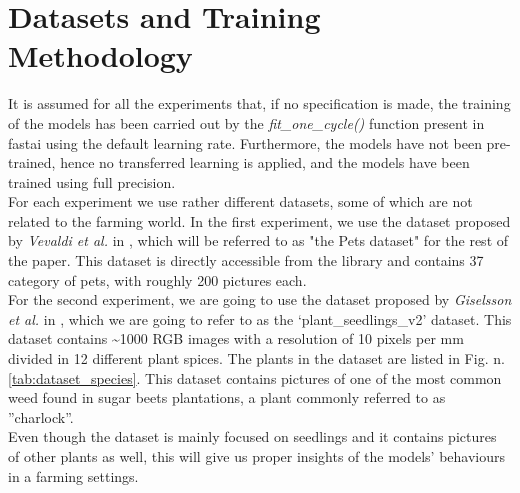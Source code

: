 \section{Datasets and Training Methodology}\label{sec:data_models}
It is assumed for all the experiments that, if no specification is made, the training of the models has been carried out by the \textit{fit\_one\_cycle()} function present in fastai using the default learning rate. Furthermore, the models have not been pre-trained, hence no transferred learning is applied, and the models have been trained using full precision. \\
For each experiment we use rather different datasets, some of which are not related to the farming world. In the first experiment, we use the dataset proposed by \textit{Vevaldi et al.} in \cite{parkhi12a}, which will be referred to as "the Pets dataset" for the rest of the paper. This dataset is directly accessible from the library and contains 37 category of pets, with roughly 200 pictures each. \\
For the second experiment, we are going to use the dataset proposed by \textit{Giselsson et al.} in \cite{giselsson2017public}, which we are going to refer to as the ‘plant\_seedlings\_v2’ dataset. This dataset contains \textasciitilde 1000 RGB images with a resolution of 10 pixels per mm divided in 12 different plant spices. The plants in the dataset are listed in Fig. n.  \ref{tab:dataset_species}. This dataset contains pictures of one of the most common weed found in sugar beets plantations, a plant commonly referred to as ''charlock''. \cite{cioni_weed_2010}\\
Even though the dataset is mainly focused on seedlings and it contains pictures of other plants as well, this will give us proper insights of the models' behaviours in a farming settings. 
